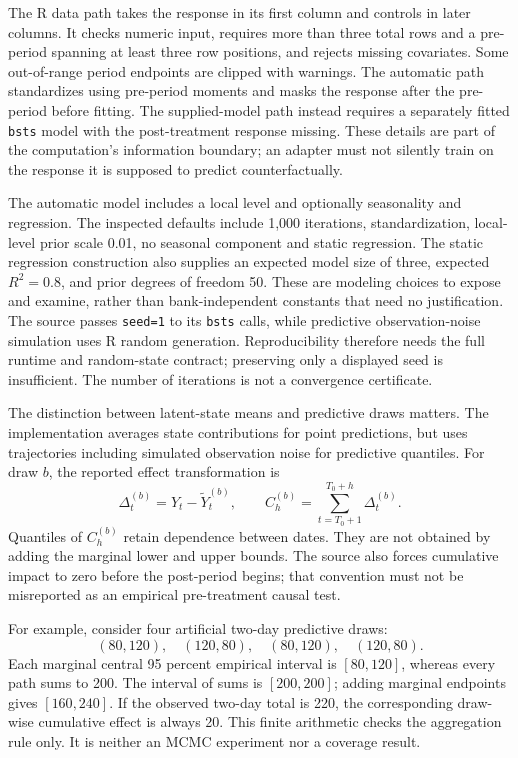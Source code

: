 The R data path takes the response in its first column and controls in later
columns. It checks numeric input, requires more than three total rows and a
pre-period spanning at least three row positions, and rejects missing
covariates. Some out-of-range period endpoints are clipped with warnings.
The automatic path standardizes using pre-period moments and masks the
response after the pre-period before fitting. The supplied-model path instead
requires a separately fitted \texttt{bsts} model with the post-treatment
response missing. These details are part of the computation's information
boundary; an adapter must not silently train on the response it is supposed
to predict counterfactually. \cite{exec13_ci_semantics}

The automatic model includes a local level and optionally seasonality and
regression. The inspected defaults include 1,000 iterations, standardization,
local-level prior scale 0.01, no seasonal component and static regression.
The static regression construction also supplies an expected model size of
three, expected \(R^2=0.8\), and prior degrees of freedom 50. These are
modeling choices to expose and examine, rather than bank-independent
constants that need no justification. The source passes \texttt{seed=1} to
its \texttt{bsts} calls, while predictive observation-noise simulation uses R
random generation. Reproducibility therefore needs the full runtime and
random-state contract; preserving only a displayed seed is insufficient.
The number of iterations is not a convergence certificate.
\cite{exec13_ci_semantics}

The distinction between latent-state means and predictive draws matters.
The implementation averages state contributions for point predictions, but
uses trajectories including simulated observation noise for predictive
quantiles. For draw \(b\), the reported effect transformation is
\[
 \Delta_t^{(b)}=Y_t-\widetilde Y_t^{(b)},\qquad
 C_h^{(b)}=\sum_{t=T_0+1}^{T_0+h}\Delta_t^{(b)}.
\]
Quantiles of \(C_h^{(b)}\) retain dependence between dates. They are not
obtained by adding the marginal lower and upper bounds. The source also
forces cumulative impact to zero before the post-period begins; that
convention must not be misreported as an empirical pre-treatment causal
test. \cite{exec13_ci_semantics,exec13_ci_brodersen2015}

For example, consider four artificial two-day predictive draws:
\[
(80,120),\quad(120,80),\quad(80,120),\quad(120,80).
\]
Each marginal central 95 percent
empirical interval is \([80,120]\), whereas every path sums to 200. The
interval of sums is \([200,200]\); adding marginal endpoints gives
\([160,240]\). If the observed two-day total is 220, the corresponding
draw-wise cumulative effect is always 20. This finite arithmetic checks the
aggregation rule only. It is neither an MCMC experiment nor a coverage result.
\cite{exec13_cimpact_examples}

